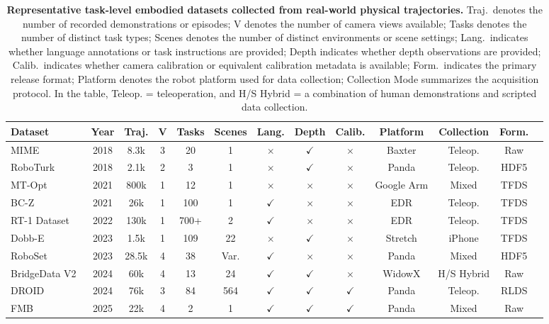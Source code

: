 \documentclass[acmsmall,screen,review]{acmart}
\begin{document}
\begin{table}[!t] 
\centering
\caption{\textbf{Representative task-level embodied datasets collected from real-world physical trajectories.} 
Traj.\ denotes the number of recorded demonstrations or episodes; 
V denotes the number of camera views available; 
Tasks denotes the number of distinct task types; Scenes denotes the number of distinct environments or scene settings; 
Lang.\ indicates whether language annotations or task instructions are provided; 
Depth indicates whether depth observations are provided;
Calib.\ indicates whether camera calibration or equivalent calibration metadata is available; 
Form.\ indicates the primary release format;
Platform denotes the robot platform used for data collection; 
Collection Mode summarizes the acquisition protocol.
In the table, Teleop. = teleoperation, and H/S Hybrid = a combination of human demonstrations and scripted data collection.}\label{tab:task_datasets}
\scriptsize
\begin{tabular}{
  l
  c
  c
  c
  c
  c
  c
  c
  c
  c
  c
  c
  c}
\toprule
\textbf{Dataset} & \textbf{Year} & \textbf{Traj.} & \textbf{V} & \textbf{Tasks} & \textbf{Scenes} & \textbf{Lang.} & \textbf{Depth} & \textbf{Calib.} & \textbf{Platform} & \textbf{Collection} & \textbf{Form.} \\
\midrule
MIME~\cite{sharma2018mime} & 2018 & 8.3k & 3 & 20 & 1 & $\times$ & $\checkmark$ & $\times$ & Baxter & Teleop. & Raw \\
RoboTurk~\cite{mandlekar2018roboturk} & 2018 & 2.1k & 2 & 3 & 1 & $\times$ & $\checkmark$ & $\times$ & Panda & Teleop. & HDF5 \\
MT-Opt~\cite{kalashnikov2021mt} & 2021 & 800k & 1 & 12 & 1 & $\times$ & $\times$ & $\times$ & Google Arm & Mixed & TFDS \\
BC-Z~\cite{jang2022bc} & 2021 & 26k & 1 & 100 & 1 & $\checkmark$ & $\times$ & $\times$ & EDR & Teleop. & TFDS \\
RT-1 Dataset~\cite{brohan2023rt1} & 2022 & 130k & 1 & 700+ & 2 & $\checkmark$ & $\times$ & $\times$ & EDR & Teleop. & TFDS \\
Dobb-E~\cite{shafiullah2023bringing} & 2023 & 1.5k & 1 & 109 & 22 & $\times$ & $\checkmark$ & $\times$ & Stretch & iPhone & TFDS \\
RoboSet~\cite{bharadhwaj2024roboagent} & 2023 & 28.5k & 4 & 38 & Var. & $\checkmark$ & $\times$ & $\times$ & Panda & Mixed & HDF5 \\
BridgeData V2~\cite{walke2024bridgedatav2} & 2024 & 60k & 4 & 13 & 24 & $\checkmark$ & $\checkmark$ & $\times$ & WidowX & H/S Hybrid & Raw \\
DROID~\cite{khazatsky2024droid} & 2024 & 76k & 3 & 84 & 564 & $\checkmark$ & $\checkmark$ & $\checkmark$ & Panda & Teleop. & RLDS \\
FMB~\cite{fu2025fmb} & 2025 & 22k & 4 & 2 & 1 & $\checkmark$ & $\checkmark$ & $\checkmark$ & Panda & Mixed & Raw \\
\bottomrule
\end{tabular}
\end{table}
\end{document}
